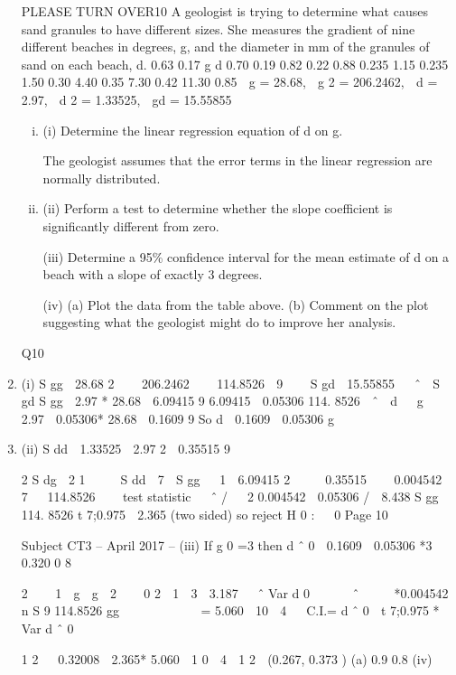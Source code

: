 \documentclass[a4paper,12pt]{article}
\begin{document}
\begin{enumerate}
PLEASE TURN OVER10
A geologist is trying to determine what causes sand granules to have different sizes.
She measures the gradient of nine different beaches in degrees, g, and the diameter in mm of the granules of sand on each beach, d.
0.63
0.17
g
d
0.70
0.19
0.82
0.22
0.88
0.235
1.15
0.235
1.50
0.30
4.40
0.35
7.30
0.42
11.30
0.85
 g = 28.68,  g 2 = 206.2462,  d = 2.97,  d 2 = 1.33525,  gd = 15.55855
\begin{enumerate}[(i)]
\item (i)
Determine the linear regression equation of d on g.

The geologist assumes that the error terms in the linear regression are normally distributed.
\item (ii)
Perform a test to determine whether the slope coefficient is significantly different from zero.

(iii) Determine a 95\% confidence interval for the mean estimate of d on a beach with a slope of exactly 3 degrees.

(iv) (a)
Plot the data from the table above.
(b)
Comment on the plot suggesting what the geologist might do to
improve her analysis.

\end{enumerate}

Q10
\item (i)
S gg

28.68 2 
  206.2462 
  114.8526

9  

S gd  15.55855 
 ˆ 
S gd
S gg

2.97 * 28.68
 6.09415
9
6.09415
 0.05306
114. 8526
 ˆ  d   g 
2.97  0.05306* 28.68
 0.1609
9
So d  0.1609  0.05306 g
\item (ii)
S dd  1.33525 
2.97 2
 0.35515
9





2
S dg
 2 1 
   S dd 
7 
S gg
  1 
6.09415 2 
   0.35515 
  0.004542
 7  
114.8526  
 
test statistic   ˆ / 
 2
0.004542
 0.05306 /
 8.438
S gg
114. 8526 
t 7;0.975  2.365 (two sided) so reject H 0 :   0
Page 10

Subject CT3  – April 2017 – %
(iii)
If g 0 =3 then d ˆ 0  0.1609  0.05306 *3  0.320 0 8

2 
  1  g  g  2  

0
2  1  3  3.187  
ˆ
Var d 0   
  ˆ   
 *0.004542
n
S
9
114.8526
gg
 
 
 
 
 
= 5.060  10  4
 
C.I.= d ˆ 0  t 7;0.975 * Var d ˆ 0

1
2

 0.32008  2.365* 5.060  1 0  4

1
2
 (0.267, 0.373 )
(a)
0.9
0.8
(iv)


\end{enumerate}
\end{document}
